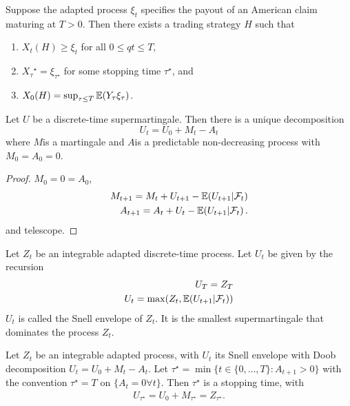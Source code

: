 \begin{thm}
  \label{sec:pric-hedg-cont-7}
  Suppose the adapted process $\xi_{t}$ specifies the payout of an
  American claim maturing at $T > 0$. Then there exists a trading
  strategy $H$ such that
  \begin{enumerate}
  \item $X_{t}(H) \geq \xi_{t}$ for all $0 \le qt \leq T$,
  \item $X_\tau{^\star} = \xi_{\tau^{\star}}$ for some stopping time
    $\tau^{\star}$, and
  \item $X_{0}(H) = \sup_{\tau \leq T} \E{Y_{\tau} \xi_{\tau}}$.
  \end{enumerate}
\end{thm}

\begin{thm}
  \label{sec:pric-hedg-cont-8}
  Let $U$ be a discrete-time supermartingale.  Then there is a unique
  decomposition
  \begin{equation}
    \label{eq:10}
    U_{t}= U_{0}+ M_{t} - A_{t}
  \end{equation} where $M$is a martingale and $A$is a predictable
  non-decreasing process with $M_{0} = A_{0} = 0$.
\end{thm}

\begin{proof}
  $M_{0} = 0 = A_{0}$,
  \begin{align}
    \label{eq:30}
    M_{t+1} = M_{t} + U_{t+1} - \E{U_{t+1} | \mathcal{F}_{t}} \\
    \label{eq:31}
    A_{t+1} = A_{t} + U_{t} - \E{U_{t+1} | \mathcal{F}_{t}}.
  \end{align} and telescope.
\end{proof}

\begin{defn}
  \label{sec:pric-hedg-cont-9}
  Let $Z_{t}$ be an integrable adapted discrete-time process. Let
  $U_{t}$ be given by the recursion
  \begin{align}
    \label{eq:11}
    U_{T} = Z_{T} \\
    U_{t} = \max (Z_{t}, \E{U_{t+1} | \mathcal{F}_{t}})
  \end{align}
  $U_{t}$ is called the Snell envelope of $Z_{t}$.  It is the smallest
  supermartingale that dominates the process $Z_{t}$.
\end{defn}

\begin{thm}
  \label{sec:pric-hedg-cont-11}
  Let $Z_{t}$ be an integrable adapted process, with $U_{t}$ its Snell
  envelope with Doob decomposition $U_{t} = U_{0} + M_{t} - A_{t}$.
  Let $\tau^{\star} = \min \{ t \in \{0, \dots, T\}: A_{t+1} > 0 \}$
  with the convention $\tau^{\star} = T$ on $\{ A_{t} = 0 \forall t
  \}$.  Then $\tau^{\star}$ is a stopping time, with
  \begin{align}
    \label{eq:12}
    U_{\tau^{\star}} = U_{0} + M_{\tau^{\star}} = Z_{\tau^{\star}}.
  \end{align}
\end{thm}


